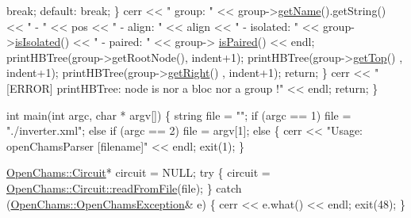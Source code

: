 \begin{DoxyCodeInclude}
                \textcolor{keywordflow}{break};
            \textcolor{keywordflow}{default}:
                \textcolor{keywordflow}{break};
        \}
        cerr << \textcolor{stringliteral}{" group: "} << group->\mbox{\hyperlink{class_open_chams_1_1_node_a3fd7335faa33dce2f87c7e50eef3e294}{getName}}().getString() << \textcolor{stringliteral}{" - "} << pos << \textcolor{stringliteral}{" - align: "} << align 
      << \textcolor{stringliteral}{" - isolated: "} << group->\mbox{\hyperlink{class_open_chams_1_1_group_ab5ae4a4550c418c974ff6e59967eeec2}{isIsolated}}() << \textcolor{stringliteral}{" - paired: "} << group->
      \mbox{\hyperlink{class_open_chams_1_1_group_aee0abf07a6e9d41f511c648e6eaecea3}{isPaired}}() << endl; 
        printHBTree(group->getRootNode(), indent+1);
        printHBTree(group->\mbox{\hyperlink{class_open_chams_1_1_node_af59967a8c2d5a04ca0a58e2ef29bead1}{getTop}}()     , indent+1);
        printHBTree(group->\mbox{\hyperlink{class_open_chams_1_1_node_a9533ddcf078ddfc2a4e9bd9ffafa51cb}{getRight}}()   , indent+1);
        \textcolor{keywordflow}{return};
    \}
    cerr << \textcolor{stringliteral}{"[ERROR] printHBTree: node is nor a bloc nor a group !"} << endl;
    \textcolor{keywordflow}{return};
\}

\textcolor{keywordtype}{int} main(\textcolor{keywordtype}{int} argc, \textcolor{keywordtype}{char} * argv[]) \{
    \textcolor{keywordtype}{string} file = \textcolor{stringliteral}{""};
    \textcolor{keywordflow}{if} (argc == 1)
        file = \textcolor{stringliteral}{"./inverter.xml"};
    \textcolor{keywordflow}{else} \textcolor{keywordflow}{if} (argc == 2)
        file = argv[1];
    \textcolor{keywordflow}{else} \{
        cerr << \textcolor{stringliteral}{"Usage: openChamsParser [filename]"} << endl;
        exit(1);
    \}

    \mbox{\hyperlink{class_open_chams_1_1_circuit}{OpenChams::Circuit}}* circuit = NULL;
    \textcolor{keywordflow}{try} \{
        circuit = \mbox{\hyperlink{class_open_chams_1_1_circuit_ad0aa3183bdea59e62f69c295026b7fe7}{OpenChams::Circuit::readFromFile}}(file);
    \} \textcolor{keywordflow}{catch} (\mbox{\hyperlink{class_open_chams_1_1_open_chams_exception}{OpenChams::OpenChamsException}}& e) \{
        cerr << e.what() << endl;
        exit(48);
    \}


\end{DoxyCodeInclude}
